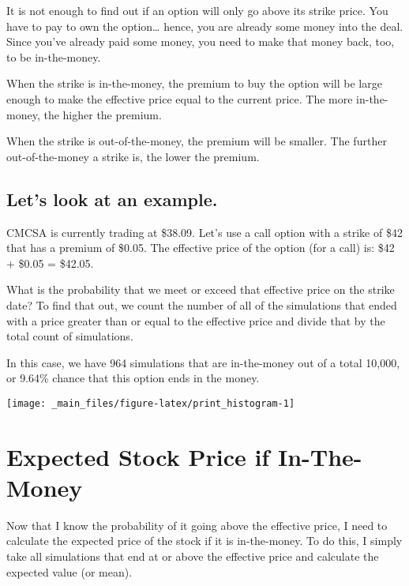 \documentclass[
]{book}
\begin{document}
It is not enough to find out if an option will only go above its strike price.
You have to pay to own the option\ldots{} hence, you are already some money into the
deal. Since you've already paid some money, you need to make that money back,
too, to be in-the-money.

When the strike is in-the-money, the premium to buy the option will be large
enough to make the effective price equal to the current price. The more
in-the-money, the higher the premium.

When the strike is out-of-the-money, the premium will be smaller. The further
out-of-the-money a strike is, the lower the premium.

\hypertarget{lets-look-at-an-example.}{%
\subsection{Let's look at an example.}\label{lets-look-at-an-example.}}

CMCSA is currently trading at \$38.09. Let's use a call option
with a strike of \$42 that has a premium of \$0.05. The effective price of the
option (for a call) is: \$42 + \$0.05 = \$42.05.

What is the probability that we meet or exceed that effective price on the
strike date? To find that out, we count the number of all of the simulations
that ended with a price greater than or equal to the effective price and divide
that by the total count of simulations.

In this case, we have 964 simulations that are in-the-money
out of a total 10,000, or
9.64\% chance that this
option ends in the money.

\begin{center}\texttt{[image: \_main\_files/figure-latex/print\_histogram-1]} \end{center}

\hypertarget{expected-stock-price-if-in-the-money}{%
\section{Expected Stock Price if In-The-Money}\label{expected-stock-price-if-in-the-money}}

Now that I know the probability of it going above the effective price, I need to
calculate the expected price of the stock if it is in-the-money. To do this, I
simply take all simulations that end at or above the effective price and
calculate the expected value (or mean).
\end{document}
